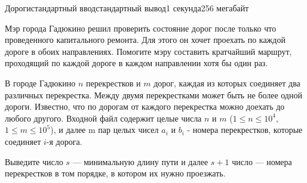 \begin{problem}{Дороги}{стандартный ввод}{стандартный вывод}{1 секунда}{256 мегабайт}

Мэр города Гадюкино решил проверить состояние дорог после только что проведенного капитального ремонта. Для этого он хочет проехать по каждой дороге в обоих направлениях. Помогите мэру составить кратчайший маршрут, проходящий по каждой дороге в каждом направлении хотя бы один раз.

\InputFile
В городе Гадюкино $n$ перекрестков и $m$ дорог, каждая из которых соединяет два различных перекрестка. Между двумя перекрестками может быть не более одной дороги. Известно, что по дорогам от каждого перекрестка можно доехать до любого другого. Входной файл содержит целые числа $n$ и $m$ ($1 \le n \le 10^4$, $1 \le m \le 10^5$), и далее m пар целых чисел $a_i$ и $b_i$ - номера перекрестков, которые соединяет $i$-я дорога.

\OutputFile
Выведите число $s$ --- минимальную длину пути и далее $s + 1$ число --- номера перекрестков в том порядке, в котором их нужно проезжать. 

\Example

\begin{example}
%
\end{example}

\end{problem}

